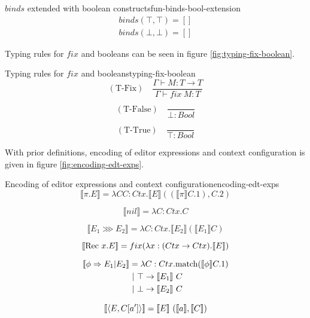 \begin{myfigure}{$binds$ extended with boolean constructs}{fun-binds-bool-extension}
    \[
        \begin{aligned}
            binds(\top,\top) = [] \\
            binds(\bot,\bot) = []
        \end{aligned}
    \]
\end{myfigure}

Typing rules for $fix$ and booleans can be seen in figure \ref{fig:typing-fix-boolean}.

\begin{myfigure}{Typing rules for $fix$ and booleans}{typing-fix-boolean}
    \[
        (\text{T-Fix}) \quad \frac{\Gamma \vdash M : T \rightarrow T}{\Gamma \vdash fix \ M : T}
    \]

    \[
        (\text{T-False}) \quad \frac{}{\bot : Bool}
    \]

    \[
        (\text{T-True}) \quad \frac{}{\top : Bool}
    \]
\end{myfigure}

With prior definitions, encoding of editor expressions and context configuration is given in figure \ref{fig:encoding-edt-exps}.

\begin{myfigure}{Encoding of editor expressions and context configuration}{encoding-edt-exps}
    \[
        \llbracket \pi.E \rrbracket = \lambda CC : Ctx.\llbracket E \rrbracket ((\llbracket \pi \rrbracket C.1), C.2)
    \]

    \[
        \llbracket nil \rrbracket = \lambda C : Ctx.C
    \]

    \[
        \llbracket E_1 \ggg E_2 \rrbracket = \lambda C : Ctx.\llbracket E_2 \rrbracket(\llbracket E_1 \rrbracket C)
    \]

    \[
        \llbracket \text{Rec } x.E \rrbracket = fix(\lambda x : (Ctx \rightarrow Ctx).\llbracket E \rrbracket)
    \]

    \[
        \begin{aligned}
            \llbracket \phi \Rightarrow E_1|E_2 \rrbracket & = \lambda C : Ctx.\text{match} (\llbracket \phi \rrbracket C.1) \\
                                           & \ | \ \top \rightarrow \llbracket E_1 \rrbracket \ C           \\
                                           & \ | \ \bot \rightarrow \llbracket E_2 \rrbracket \ C
        \end{aligned}
    \]

    \[
        \enc{\conf{E}{C[a']}} = \enc{E} \ (\enc{a}, \enc{C})
    \]
\end{myfigure}

